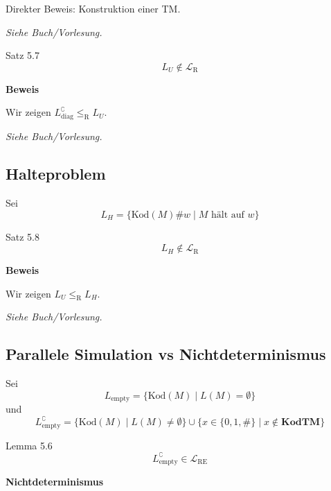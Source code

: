 \documentclass[a4paper, 11pt]{article}
\def\Lre{\mathcal{L}_\text{RE}}
\def\Lr{\mathcal{L}_\text{R}}
\newcommand\myTitle[1]{{\large \textbf {#1}}}
\begin{document}
                    Direkter Beweis: Konstruktion einer TM.
                
                    \textit{Siehe Buch/Vorlesung.}
                
                    \begin{mainbox}{Satz 5.7}
                        $$L_U \notin \Lr$$
                    \end{mainbox}
                    \textbf{Beweis}
                
                    Wir zeigen $L_{\text{diag}}^\complement \leq_{\text{R}} L_U$.
                
                    \textit{Siehe Buch/Vorlesung.}
                    \subsection{Halteproblem}
                    Sei $$L_H = \{\text{Kod}(M)\#w \mid M \text{ hält auf }w\}$$
                    \begin{mainbox}{Satz 5.8}
                        $$L_H \notin \Lr$$
                    \end{mainbox}
                    \textbf{Beweis}
                
                    Wir zeigen $L_U \leq_{\text{R}} L_H$.
                
                    \textit{Siehe Buch/Vorlesung.}
                
                
                
                
                
                    \subsection{Parallele Simulation vs Nichtdeterminismus}
                    Sei 
                    $$L_{\text{empty}} = \{\text{Kod}(M) \mid L(M) = \emptyset\}$$
                    und 
                    $$L_{\text{empty}}^\complement = \{\text{Kod}(M) \mid L(M) \neq \emptyset\} \cup \{x \in \{0,1, \#\}\mid x \notin \textbf{KodTM}\}$$
                    \begin{mainbox}{Lemma 5.6}
                        $$L_{\text{empty}}^\complement \in \Lre$$
                    \end{mainbox}
                
                
                
                    \myTitle{Nichtdeterminismus}
\end{document}
